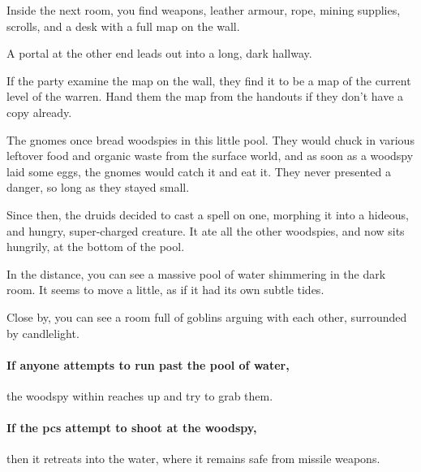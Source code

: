 \begin{multicols}{2}
\begin{itemize}
\end{itemize}

\begin{boxtext}

  Inside the next room, you find weapons, leather armour, rope, mining supplies, scrolls, and a desk with a full map on the wall.

  A portal at the other end leads out into a long, dark hallway.

\end{boxtext}

If the party examine the map on the wall, they find it to be a map of the current level of the warren.
Hand them the map from the handouts if they don't have a copy already.


\begin{exampletext}

  The gnomes once bread woodspies in this little pool.
  They would chuck in various leftover food and organic waste from the surface world, and as soon as a woodspy laid some eggs, the gnomes would catch it and eat it.
  They never presented a danger, so long as they stayed small.

  Since then, the druids decided to cast a spell on one, morphing it into a hideous, and hungry, super-charged creature.
  It ate all the other woodspies, and now sits hungrily, at the bottom of the pool.

\end{exampletext}

\begin{boxtext}

  In the distance, you can see a massive pool of water shimmering in the dark room.
  It seems to move a little, as if it had its own subtle tides.

  Close by, you can see a room full of goblins arguing with each other, surrounded by candlelight.

\end{boxtext}


\paragraph{If anyone attempts to run past the pool of water,}
the woodspy within reaches up and try to grab them.

\paragraph{If the \glspl{pc} attempt to shoot at the woodspy,}
then it retreats into the water, where it remains safe from missile weapons.


\end{multicols}
